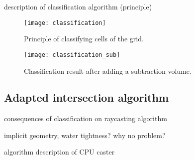 description of classification algorithm (principle)

\begin{figure}
\centering
\texttt{[image: classification]}
\caption{Principle of classifying cells of the grid.}
\label{fig:classification}
\end{figure}

\begin{figure}
\centering
\texttt{[image: classification\_sub]}
\caption{Classification result after adding a subtraction volume. }
\label{fig:classification_sub}
\end{figure}

\subsection{Adapted intersection algorithm}
\label{sec:adapted_ray_casting}

consequences of classification on raycasting algorithm

implicit geometry, water tightness? why no problem?

algorithm description of CPU caster
